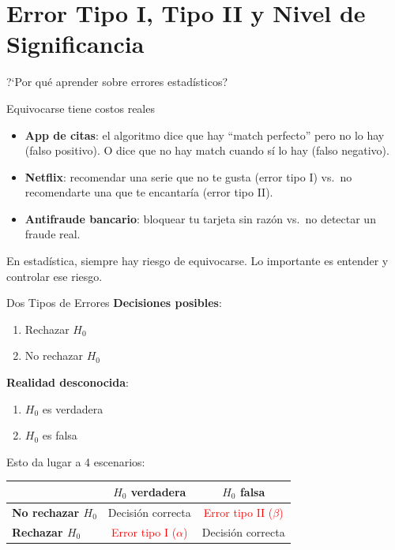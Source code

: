 \documentclass[aspectratio=169, 11pt]{beamer}
\begin{document}
\section{Error Tipo I, Tipo II y Nivel de Significancia}

\begin{frame}{?`Por qu\'e aprender sobre errores estad\'isticos?}
\small
\begin{exampleblock}{Equivocarse tiene costos reales}
\begin{itemize}\setlength{\itemsep}{2pt}
  \item \textbf{App de citas}: el algoritmo dice que hay ``match perfecto'' pero no lo hay (falso positivo). O dice que no hay match cuando s\'i lo hay (falso negativo).
  \item \textbf{Netflix}: recomendar una serie que no te gusta (error tipo I) vs.\ no recomendarte una que te encantar\'ia (error tipo II).
  \item \textbf{Antifraude bancario}: bloquear tu tarjeta sin raz\'on vs.\ no detectar un fraude real.
\end{itemize}
\end{exampleblock}

\vspace{0.2cm}
En estad\'istica, \alert{siempre} hay riesgo de equivocarse. Lo importante es entender y controlar ese riesgo.
\end{frame}

\begin{frame}{Dos Tipos de Errores}
\textbf{Decisiones posibles}:
\begin{enumerate}
  \item Rechazar $H_0$
  \item No rechazar $H_0$
\end{enumerate}

\vspace{0.3cm}
\textbf{Realidad desconocida}:
\begin{enumerate}
  \item $H_0$ es verdadera
  \item $H_0$ es falsa
\end{enumerate}

\vspace{0.3cm}
Esto da lugar a 4 escenarios:
\begin{table}
\centering
\small
\begin{tabular}{lcc}
\toprule
& \textbf{$H_0$ verdadera} & \textbf{$H_0$ falsa} \\
\midrule
\textbf{No rechazar $H_0$} & Decisión correcta & \textcolor{red}{Error tipo II ($\beta$)} \\
\textbf{Rechazar $H_0$} & \textcolor{red}{Error tipo I ($\alpha$)} & Decisión correcta \\
\bottomrule
\end{tabular}
\end{table}
\end{frame}
\end{document}
